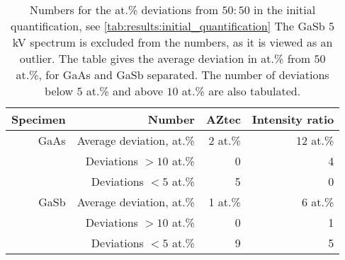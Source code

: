 \begin{table}[phtb]
    \begin{center}
        \caption{
            Numbers for the at.\% deviations from $50:50$ in the initial quantification, see \cref{tab:results:initial_quantification}
            The GaSb $5$ kV spectrum is excluded from the numbers, as it is viewed as an outlier.
            The table gives the average deviation in at.\% from $50$ at.\%, for GaAs and GaSb separated.
            The number of deviations below $5$ at.\% and above $10$ at.\% are also tabulated.
        }
        \label{tab:results:initial_quantification_stats}
        \begin{tabular}{rrrr}
            \hline
            \textbf{Specimen} & \textbf{Number}         & \textbf{AZtec} & \textbf{Intensity ratio} \\
            \hline
            GaAs              & Average deviation, at.\% & 2 at.\%         & 12 at.\%                  \\
                              & Deviations $>10$ at.\%   & 0              & 4                        \\
                              & Deviations  $<5$  at.\%  & 5              & 0                        \\
            \hline
            GaSb              & Average deviation, at.\% & 1 at.\%         & 6 at.\%                   \\
                              & Deviations $>10$ at.\%   & 0              & 1                        \\
                              & Deviations  $<5$  at.\%  & 9              & 5                        \\

            \hline
        \end{tabular}
    \end{center}
\end{table}
